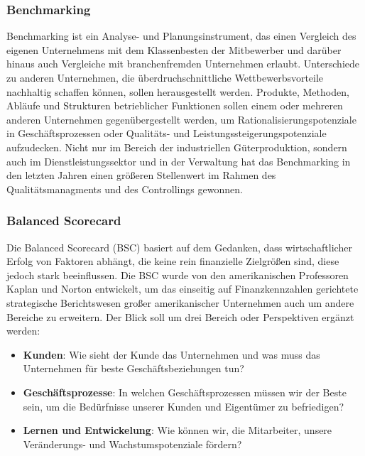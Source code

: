 \subsubsection{Benchmarking}
Benchmarking ist ein Analyse- und Planungsinstrument, das einen Vergleich des eigenen Unternehmens mit dem Klassenbesten der Mitbewerber und darüber hinaus auch Vergleiche mit branchenfremden Unternehmen erlaubt. Unterschiede zu anderen Unternehmen, die überdruchschnittliche Wettbewerbsvorteile nachhaltig schaffen können, sollen herausgestellt werden. Produkte, Methoden, Abläufe und Strukturen betrieblicher Funktionen sollen einem oder mehreren anderen Unternehmen gegenübergestellt werden, um Rationalisierungspotenziale in Geschäftsprozessen oder Qualitäts- und Leistungssteigerungspotenziale aufzudecken. Nicht nur im Bereich der industriellen Güterproduktion, sondern auch im Dienstleistungssektor und in der Verwaltung hat das Benchmarking in den letzten Jahren einen größeren Stellenwert im Rahmen des Qualitätsmanagments und des Controllings gewonnen.

\subsubsection{Balanced Scorecard}

Die Balanced Scorecard (BSC) basiert auf dem Gedanken, dass wirtschaftlicher Erfolg von Faktoren abhängt, die keine rein finanzielle Zielgrößen sind, diese jedoch stark beeinflussen. Die BSC wurde von den amerikanischen Professoren Kaplan und Norton entwickelt, um das einseitig auf Finanzkennzahlen gerichtete strategische Berichtswesen großer amerikanischer Unternehmen auch um andere Bereiche zu erweitern. Der Blick soll um drei Bereich oder Perspektiven ergänzt werden:
\begin{itemize}
	\item {\bf Kunden}: Wie sieht der Kunde das Unternehmen und was muss das Unternehmen für beste Geschäftsbeziehungen tun?
	\item {\bf Geschäftsprozesse}: In welchen Geschäftsprozessen müssen wir der Beste sein, um die Bedürfnisse unserer Kunden und Eigentümer zu befriedigen?
	\item {\bf Lernen und Entwickelung}: Wie können wir, die Mitarbeiter, unsere Veränderungs- und Wachstumspotenziale fördern?
\end{itemize}\newline

